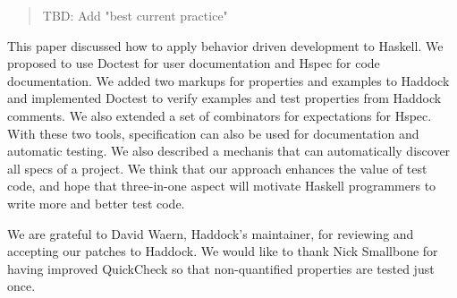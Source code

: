 \documentclass[preprint]{sigplanconf}
\begin{document}
\begin{quote}
    TBD: Add "best current practice"
\end{quote}

This paper discussed how to apply behavior driven development to
Haskell.  We proposed to use Doctest for user documentation and Hspec
for code documentation. We added two markups for
properties and examples to Haddock and implemented
Doctest to verify examples and test properties from Haddock comments.
We also extended a set of combinators for expectations for Hspec.
With these two tools, specification can also be
used for documentation and automatic testing.  We also described a
mechanis that can automatically discover all specs of a project.  We
think that our approach enhances the value of test code, and hope
that three-in-one aspect will motivate Haskell programmers to write
more and better test code.

\acks

We are grateful to David Waern, Haddock's maintainer, for reviewing and
accepting our patches to Haddock.
We would like to thank
Nick Smallbone for having improved QuickCheck so that
non-quantified properties are tested just once.




\end{document}
